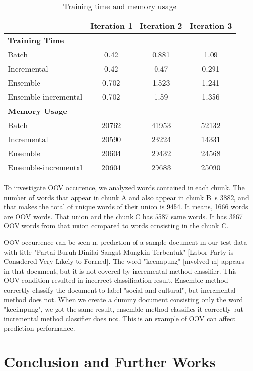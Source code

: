 \documentclass[conference]{IEEEtran}
\begin{document}
\begin{table}[!htb]
\renewcommand{\arraystretch}{1.3}
\caption{Training time and memory usage}
\label{profile}
\centering
\begin{tabular}{|l|c|c|c|}
\hline
 & Iteration 1 & Iteration 2 & Iteration 3\\
\hline
\textbf{Training Time} & & & \\
\hline
Batch & 0.42 & 0.881 & 1.09\\
\hline
Incremental & 0.42 & 0.47 & 0.291\\
\hline
Ensemble & 0.702 & 1.523 & 1.241\\
\hline
Ensemble-incremental & 0.702 & 1.59 & 1.356\\
\hline
\textbf{Memory Usage} & & & \\
\hline
Batch & 20762 & 41953 & 52132\\
\hline
Incremental & 20590 & 23224 & 14331\\
\hline
Ensemble & 20604 & 29432 & 24568\\
\hline
Ensemble-incremental & 20604 & 29683 & 25090\\
\hline
\end{tabular}
\end{table}

To investigate OOV occurence, we analyzed words contained in each chunk.
The number of words that appear in chunk A and also appear in chunk B is 3882, and that makes the total of unique words of their union is 9454.
It means, 1666 words are OOV words.
That union and the chunk C has 5587 same words.
It has 3867 OOV words from that union compared to words consisting in the chunk C.

OOV occurrence can be seen in prediction of a sample document in our test data with title "Partai Buruh Dinilai Sangat Mungkin Terbentuk" [Labor Party is Considered Very Likely to Formed].
The word "kecimpung" [involved in] appears in that document, but it is not covered by incremental method classifier.
This OOV condition resulted in incorrect classification result.
Ensemble method correctly classify the document to label "social and cultural", but incremental method does not.
When we create a dummy document consisting only the word "kecimpung", we got the same result, ensemble method classifies it correctly but incremental method classifier does not.
This is an example of OOV can affect prediction performance.

\section{Conclusion and Further Works}
\end{document}
